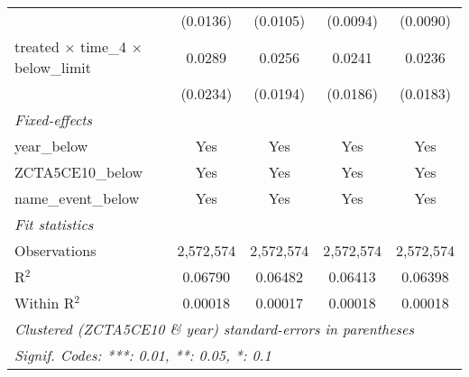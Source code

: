 \begin{tabular}{lcccc}
                                                       & (0.0136)        & (0.0105)        & (0.0094)        & (0.0090)\\   
   treated $\times$ time\_4 $\times$ below\_limit      & 0.0289          & 0.0256          & 0.0241          & 0.0236\\   
                                                       & (0.0234)        & (0.0194)        & (0.0186)        & (0.0183)\\   
   \midrule
   \emph{Fixed-effects}\\
   year\_below                                         & Yes             & Yes             & Yes             & Yes\\  
   ZCTA5CE10\_below                                    & Yes             & Yes             & Yes             & Yes\\  
   name\_event\_below                                  & Yes             & Yes             & Yes             & Yes\\  
   \midrule
   \emph{Fit statistics}\\
   Observations                                        & 2,572,574       & 2,572,574       & 2,572,574       & 2,572,574\\  
   R$^2$                                               & 0.06790         & 0.06482         & 0.06413         & 0.06398\\  
   Within R$^2$                                        & 0.00018         & 0.00017         & 0.00018         & 0.00018\\  
   \midrule \midrule
   \multicolumn{5}{l}{\emph{Clustered (ZCTA5CE10 \& year) standard-errors in parentheses}}\\
   \multicolumn{5}{l}{\emph{Signif. Codes: ***: 0.01, **: 0.05, *: 0.1}}\\
\end{tabular}
\par\endgroup
